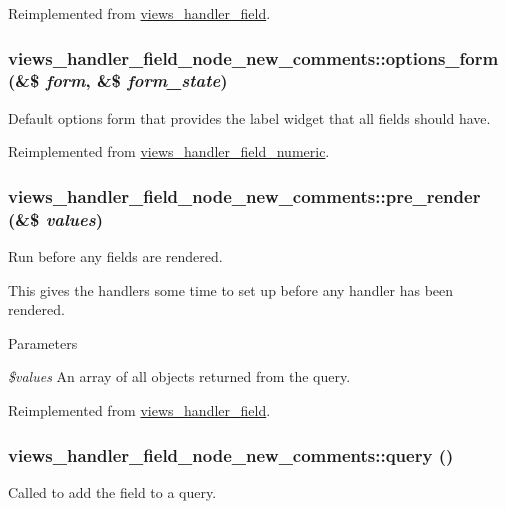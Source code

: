 Reimplemented from \hyperlink{classviews__handler__field_a3a290c7df3ead81e5cd244ad5335b1cc}{views\_\-handler\_\-field}.\hypertarget{classviews__handler__field__node__new__comments_a2a209d3acbaa47e781df96bc0ca85156}{
\subsubsection[{options\_\-form}]{\setlength{\rightskip}{0pt plus 5cm}views\_\-handler\_\-field\_\-node\_\-new\_\-comments::options\_\-form (\&\$ {\em form}, \/  \&\$ {\em form\_\-state})}}
\label{classviews__handler__field__node__new__comments_a2a209d3acbaa47e781df96bc0ca85156}
Default options form that provides the label widget that all fields should have. 

Reimplemented from \hyperlink{classviews__handler__field__numeric_ae6f81d1896ece64e9450ebc2d60da2fd}{views\_\-handler\_\-field\_\-numeric}.\hypertarget{classviews__handler__field__node__new__comments_aa5442b95bd06e86ca293e30ae4ca96bb}{
\subsubsection[{pre\_\-render}]{\setlength{\rightskip}{0pt plus 5cm}views\_\-handler\_\-field\_\-node\_\-new\_\-comments::pre\_\-render (\&\$ {\em values})}}
\label{classviews__handler__field__node__new__comments_aa5442b95bd06e86ca293e30ae4ca96bb}
Run before any fields are rendered.

This gives the handlers some time to set up before any handler has been rendered.


\begin{DoxyParams}{Parameters}
\item[{\em \$values}]An array of all objects returned from the query. \end{DoxyParams}


Reimplemented from \hyperlink{classviews__handler__field_aff134f525e1f83271183939fda4cd0e8}{views\_\-handler\_\-field}.\hypertarget{classviews__handler__field__node__new__comments_ab49cfad0c25d081f0ee70e2e0d0db809}{
\subsubsection[{query}]{\setlength{\rightskip}{0pt plus 5cm}views\_\-handler\_\-field\_\-node\_\-new\_\-comments::query ()}}
\label{classviews__handler__field__node__new__comments_ab49cfad0c25d081f0ee70e2e0d0db809}
Called to add the field to a query. 

